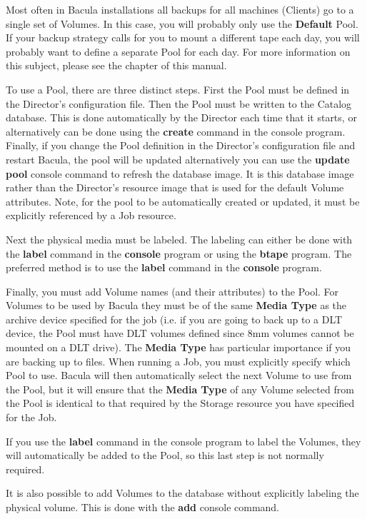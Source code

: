 Most often in Bacula installations all backups for all machines (Clients) go
to a single set of Volumes. In this case, you will probably only use the {\bf
Default} Pool. If your backup strategy calls for you to mount a different tape
each day, you will probably want to define a separate Pool for each day. For
more information on this subject, please see the 
 chapter of this
manual. 


To use a Pool, there are three distinct steps. First the Pool must be defined
in the Director's configuration file. Then the Pool must be written to the
Catalog database. This is done automatically by the Director each time that it
starts, or alternatively can be done using the {\bf create} command in the
console program. Finally, if you change the Pool definition in the Director's
configuration file and restart Bacula, the pool will be updated alternatively
you can use the {\bf update pool} console command to refresh the database
image. It is this database image rather than the Director's resource image
that is used for the default Volume attributes. Note, for the pool to be
automatically created or updated, it must be explicitly referenced by a Job
resource. 

Next the physical media must be labeled. The labeling can either be done with
the {\bf label} command in the {\bf console} program or using the {\bf btape}
program. The preferred method is to use the {\bf label} command in the {\bf
console} program. 

Finally, you must add Volume names (and their attributes) to the Pool. For
Volumes to be used by Bacula they must be of the same {\bf Media Type} as the
archive device specified for the job (i.e. if you are going to back up to a
DLT device, the Pool must have DLT volumes defined since 8mm volumes cannot be
mounted on a DLT drive). The {\bf Media Type} has particular importance if you
are backing up to files. When running a Job, you must explicitly specify which
Pool to use. Bacula will then automatically select the next Volume to use from
the Pool, but it will ensure that the {\bf Media Type} of any Volume selected
from the Pool is identical to that required by the Storage resource you have
specified for the Job. 

If you use the {\bf label} command in the console program to label the
Volumes, they will automatically be added to the Pool, so this last step is
not normally required. 

It is also possible to add Volumes to the database without explicitly labeling
the physical volume. This is done with the {\bf add} console command. 

